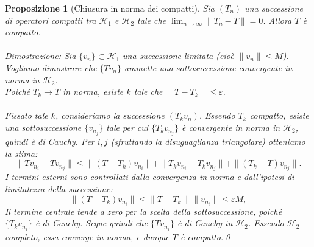 \documentclass[a4paper,12pt]{report}
\newtheorem{proposizione}{Proposizione}[chapter]
\begin{document}
\begin{proposizione}[Chiusura in norma dei compatti]
Sia \((T_n)\) una successione di operatori compatti tra \(\mathscr{H}_1\) e \(\mathscr{H}_2\) tale che $\displaystyle\lim_{n\to\infty}\|T_n - T\|= 0$. Allora \(T\) è compatto.
\\
\\\underline{Dimostrazione}: Sia \(\{v_n\}\subset \mathscr{H}_1\) una successione limitata (cioè \(\|v_n\|\leq M\)). Vogliamo dimostrare che \(\{Tv_n\}\) ammette una sottosuccessione convergente in norma in \(\mathscr{H}_2\).
\\Poiché \(T_k \to T\) in norma, esiste \(k\) tale che $\|T - T_k\| \leq \varepsilon$.
\\
\\Fissato tale \(k\), consideriamo la successione \((T_k v_n)\). Essendo \(T_k\) compatto, esiste una sottosuccessione \(\{v_{n_j}\}\) tale per cui \(\{T_k v_{n_j}\}\) è convergente in norma in \(\mathscr{H}_2\), quindi è di Cauchy. Per \(i,j\) (sfruttando la disuguaglianza triangolare) otteniamo la stima:
\[
\|Tv_{n_i} - Tv_{n_j}\|
\leq \|(T-T_k)v_{n_i}\|
+ \|T_k v_{n_i} - T_k v_{n_j}\|
+ \|(T_k - T)v_{n_j}\|.
\]
I termini esterni sono controllati dalla convergenza in norma e dall'ipotesi di limitatezza della successione:
\[
\|(T-T_k)v_{n_i}\| \leq \|T-T_k\|\,\|v_{n_i}\| \leq \varepsilon M,
\]
Il termine centrale tende a zero per la scelta della sottosuccessione, poiché \(\{T_k v_{n_j}\}\) è di Cauchy. Segue quindi che \(\{Tv_{n_j}\}\) è di Cauchy in \(\mathscr{H}_2\). Essendo \(\mathscr{H}_2\) completo, essa converge in norma, e dunque \(T\) è compatto.\qed
\end{proposizione}
\end{document}
